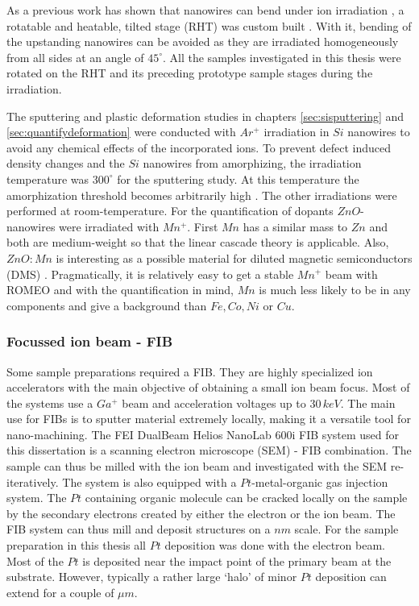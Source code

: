 As a previous work has shown that nanowires can bend under ion irradiation \cite{borschel_permanent_2011, borschel_ion-solid_2012}, a rotatable and heatable, tilted stage (RHT) was custom built \cite{noack_sputter_2014}. With it, bending of the upstanding nanowires can be avoided as they are irradiated homogeneously from all sides at an angle of $45^\circ$. All the samples investigated in this thesis were rotated on the RHT and its preceding prototype sample stages during the irradiation. 

The sputtering and plastic deformation studies in chapters \ref{sec:sisputtering} and \ref{sec:quantifydeformation} were conducted with $Ar^+$ irradiation in $Si$ nanowires to avoid any chemical effects of the incorporated ions. To prevent defect induced density changes and the $Si$ nanowires from amorphizing, the irradiation temperature was $300^\circ$ for the sputtering study. At this temperature the amorphization threshold becomes arbitrarily high \cite{pelaz_ion-beam-induced_2004}. The other irradiations were performed at room-temperature. For the quantification of dopants $ZnO$-nanowires were irradiated with $Mn^+$. First $Mn$ has a similar mass to $Zn$ and both are medium-weight so that the linear cascade theory is applicable. Also, $ZnO:Mn$ is interesting as a possible material for diluted magnetic semiconductors (DMS) \cite{furdyna_diluted_1988,norberg_synthesis_2004}. Pragmatically, it is relatively easy to get a stable $Mn^+$ beam with ROMEO and with the quantification in mind, $Mn$ is much less likely to be in any components and give a background than $Fe, Co, Ni$ or $Cu$.

 

\subsubsection{Focussed ion beam - FIB}

Some sample preparations required a FIB. They are highly specialized ion accelerators with the main objective of obtaining a small ion beam focus. Most of the systems use a $Ga^+$ beam and acceleration voltages up to $30\,keV$. The main use for FIBs is to sputter material extremely locally, making it a versatile tool for nano-machining. The FEI DualBeam Helios NanoLab 600i FIB system used for this dissertation is a scanning electron microscope (SEM) - FIB combination. The sample can thus be milled with the ion beam and investigated with the SEM re-iteratively. The system is also equipped with a $Pt$-metal-organic gas injection system. The $Pt$ containing organic molecule can be cracked locally on the sample by the secondary electrons created by either the electron or the ion beam. The FIB system can thus mill and deposit structures on a $nm$ scale. For the sample preparation in this thesis all $Pt$ deposition was done with the electron beam. Most of the $Pt$ is deposited near the impact point of the primary beam at the substrate. However, typically a rather large `halo' of minor $Pt$ deposition can extend for a couple of $\mu m$. 

